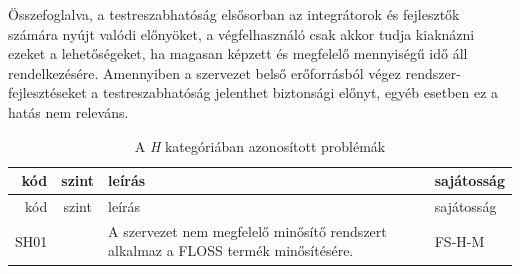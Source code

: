 \documentclass[12pt,magyar,a4paper,oneside]{scrreprt}
\begin{document}
Összefoglalva, a testreszabhatóság elsősorban az integrátorok és
fejlesztők számára nyújt valódi előnyöket, a végfelhasználó csak akkor
tudja kiaknázni ezeket a lehetőségeket, ha magasan képzett és megfelelő
mennyiségű idő áll rendelkezésére. Amennyiben a szervezet belső
erőforrásból végez rendszer-fejlesztéseket a testreszabhatóság jelenthet
biztonsági előnyt, egyéb esetben ez a hatás nem releváns.

\begin{longtable}[]{@{}rcll@{}}
\caption{A \emph{H} kategóriában azonosított problémák}\tabularnewline
\toprule
\begin{minipage}[b]{0.03\columnwidth}\raggedleft
kód\strut
\end{minipage} & \begin{minipage}[b]{0.03\columnwidth}\centering
szint\strut
\end{minipage} & \begin{minipage}[b]{0.69\columnwidth}\raggedright
leírás\strut
\end{minipage} & \begin{minipage}[b]{0.13\columnwidth}\raggedright
sajátosság\strut
\end{minipage}\tabularnewline
\midrule
\endfirsthead
\toprule
\begin{minipage}[b]{0.03\columnwidth}\raggedleft
kód\strut
\end{minipage} & \begin{minipage}[b]{0.03\columnwidth}\centering
szint\strut
\end{minipage} & \begin{minipage}[b]{0.69\columnwidth}\raggedright
leírás\strut
\end{minipage} & \begin{minipage}[b]{0.13\columnwidth}\raggedright
sajátosság\strut
\end{minipage}\tabularnewline
\midrule
\endhead
\begin{minipage}[t]{0.03\columnwidth}\raggedleft
SH01\strut
\end{minipage} & \begin{minipage}[t]{0.03\columnwidth}\centering
1\strut
\end{minipage} & \begin{minipage}[t]{0.69\columnwidth}\raggedright
A szervezet nem megfelelő minősítő rendszert alkalmaz a FLOSS termék
minősítésére.\strut
\end{minipage} & \begin{minipage}[t]{0.13\columnwidth}\raggedright
FS-H-M\strut
\end{minipage}\tabularnewline

\end{longtable}
\end{document}

